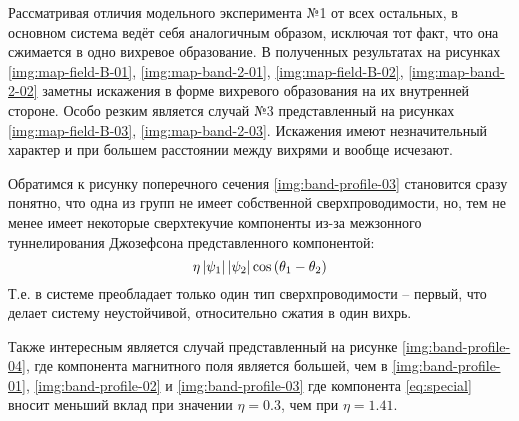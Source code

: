 Рассматривая отличия модельного эксперимента №1 от всех остальных, в основном 
система ведёт себя аналогичным образом, исключая тот факт, что она сжимается 
в одно вихревое образование. В полученных результатах на рисунках 
\ref{img:map-field-B-01}, \ref{img:map-band-2-01}, \ref{img:map-field-B-02}, 
\ref{img:map-band-2-02} заметны искажения в форме вихревого образования на их 
внутренней стороне. Особо резким является случай №3 представленный на рисунках 
\ref{img:map-field-B-03}, \ref{img:map-band-2-03}. Искажения имеют 
незначительный характер и при большем расстоянии между вихрями и вообще 
исчезают. 

Обратимся к рисунку поперечного сечения \ref{img:band-profile-03} становится 
сразу понятно, что одна из групп не имеет собственной сверхпроводимости, но, 
тем не менее имеет некоторые сверхтекучие компоненты из-за межзонного 
туннелирования Джозефсона представленного компонентой:
\begin{equation} 
    \eta\left| \psi_1 \right|\left| \psi_2 \right|\cos\left( \theta_1 - \theta_2 \right)
    \label{eq:special}
\end{equation}
Т.е. в системе преобладает только один тип сверхпроводимости -- первый, что 
делает систему неустойчивой, относительно сжатия в один вихрь. 

Также интересным является случай представленный на рисунке 
\ref{img:band-profile-04}, где компонента магнитного поля является большей, 
чем в \ref{img:band-profile-01}, \ref{img:band-profile-02} и 
\ref{img:band-profile-03} где компонента \eqref{eq:special} вносит меньший
вклад при значении \( \eta = 0.3 \), чем при \( \eta = 1.41 \).

\newpage